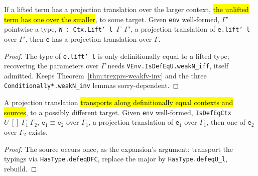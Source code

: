\begin{theorem}
\label{thm:trproj-weak-inv}
\leanok
{}
 

 If a lifted term has a projection translation over the larger context, \hl{the unlifted term has one over the smaller}, to some target. Given \texttt{env} well-formed, $\Gamma'$ pointwise a type, \texttt{W : Ctx.Lift' l $\Gamma$ $\Gamma'$}, a projection translation of \texttt{e.lift' l} over $\Gamma'$, then \texttt{e} has a projection translation over $\Gamma$.
\end{theorem}
\begin{proof}
\stSorry{} The type of \texttt{e.lift' l} is only definitionally equal to a lifted type; recovering the parameters over $\Gamma$ needs \texttt{VEnv.IsDefEqU.weakN\_iff}, itself admitted. Keeps Theorem~\ref{thm:trexprs-weakfv-inv} and the three \texttt{Conditionally*.weakN\_inv} lemmas sorry-dependent.
\end{proof}

\begin{theorem}
\label{thm:trproj-defeqdfc}
\leanok
{}
 

 A projection translation \hl{transports along definitionally equal contexts and sources}, to a possibly different target. Given \texttt{env} well-formed, \texttt{IsDefEqCtx} $U\ []\ \Gamma_1\ \Gamma_2$, $\texttt{e}_1 \equiv \texttt{e}_2$ over $\Gamma_1$, a projection translation of \texttt{e}$_1$ over $\Gamma_1$, then one of \texttt{e}$_2$ over $\Gamma_2$ exists.
\end{theorem}
\begin{proof}
\leanok
{} The source occurs once, as the expansion's argument: transport the typings via \texttt{HasType.defeqDFC}, replace the major by \texttt{HasType.defeqU\_l}, rebuild.
\end{proof}

